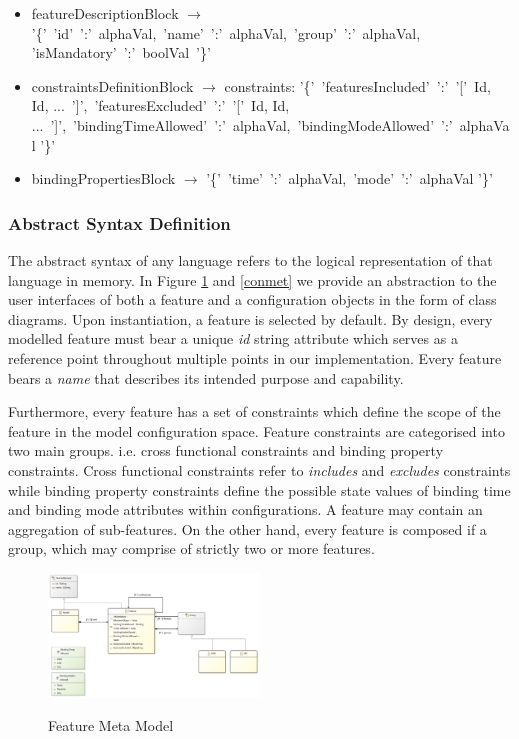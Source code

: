 \documentclass[conference]{IEEEtran}
\begin{document}
\begin{itemize}
	\item[] featureDescriptionBlock $\longrightarrow$ '\{'\ 'id'\ ':'\ alphaVal,\ 'name'\ ':'\ alphaVal,\ 'group'\ ':'\ alphaVal, 'isMandatory'\ ':'\ boolVal\ '\}' \\
	
	\item[] constraintsDefinitionBlock $\longrightarrow$ constraints: '\{'\ 'featuresIncluded'\ ':'\ '['\ Id, Id, ...\ ']',\ 'featuresExcluded'\ ':'\ '['\ Id, Id, ...\ ']',\ 'bindingTimeAllowed'\ ':'\ alphaVal,\ 'bindingModeAllowed'\ ':'\ alphaVal '\}'\\
	
	\item[] bindingPropertiesBlock $\longrightarrow$ '\{'\ 'time'\ ':'\ alphaVal,\ 'mode'\ ':'\ alphaVal '\}'\\
\end{itemize}

\subsubsection{Abstract Syntax Definition}
The abstract syntax of any language refers to the logical representation of that language in memory. In Figure \ref{femet} and \ref{conmet} we provide an abstraction to the user interfaces of both a feature and a configuration objects in the form of class diagrams. Upon instantiation, a feature is selected by default. By design, every modelled feature must bear a unique \textit{id} string attribute which serves as a reference point throughout multiple points in our implementation. Every feature bears a \textit{name} that describes its intended purpose and capability. 

Furthermore, every feature has a set of constraints which define the scope of the feature in the model configuration space. Feature constraints are categorised into two main groups. i.e. cross functional constraints and binding property constraints.  Cross functional constraints refer to \textit{includes} and \textit{excludes} constraints while binding property constraints define the possible state values of binding time and binding mode attributes within configurations. A feature may contain an aggregation of sub-features. On the other hand, every feature is composed if a group, which may comprise of strictly two or more features.

\begin{figure}[H]
\caption{Feature Meta Model}
\centering
\includegraphics[width=0.5\textwidth]{diagrams/feature.png}
\label{femet}
\end{figure}
\end{document}
